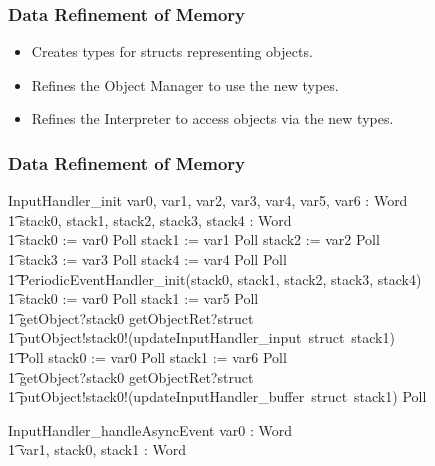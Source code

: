 \documentclass{beamer}
\begin{document}
\begin{frame}
  \frametitle{Data Refinement of Memory}
  \begin{itemize}
  \item Creates types for structs representing objects.
  \item Refines the Object Manager to use the new types.
  \item Refines the Interpreter to access objects via the new types.
  \end{itemize}
\end{frame}

\begin{frame}[shrink]
  \frametitle{Data Refinement of Memory}
  \setlength{\zedleftsep}{0cm}
  \setlength{\zedindent}{0cm}
  \begin{circus}
    InputHandler\_init \circdef \circval var0, var1, var2, var3, var4, var5, var6 : Word  \circspot \\
    \t1 \circvar stack0, stack1, stack2, stack3, stack4 : Word \circspot \\
    \t1 stack0 := var0 \circseq Poll \circseq stack1 := var1 \circseq Poll \circseq stack2 := var2 \circseq Poll \circseq \\
    \t1 stack3 := var3 \circseq Poll \circseq stack4 := var4 \circseq Poll \circseq Poll \circseq \\
    \t1 PeriodicEventHandler\_init(stack0, stack1, stack2, stack3, stack4) \circseq \\
    \t1 stack0 := var0 \circseq Poll \circseq stack1 := var5 \circseq Poll \circseq \\
    \t1 {\color{red} getObject?stack0 \then getObjectRet?struct \then {}} \\
    \t1 {\color{red} putObject!stack0!(updateInputHandler\_input~struct~stack1)  \then {}  \Skip} \circseq \\
    \t1 Poll \circseq stack0 := var0 \circseq Poll \circseq stack1 := var6 \circseq Poll \circseq \\
    \t1 {\color{red} getObject?stack0 \then getObjectRet?struct \then {}} \\
    \t1 {\color{red} putObject!stack0!(updateInputHandler\_buffer~struct~stack1) \then \Skip} \circseq Poll
  \end{circus}
  \begin{circus}
    InputHandler\_handleAsyncEvent \circdef \circval var0 : Word \circspot \\
    \t1 \circvar var1, stack0, stack1 : Word \circspot \\

\end{circus}
\end{frame}
\end{document}
